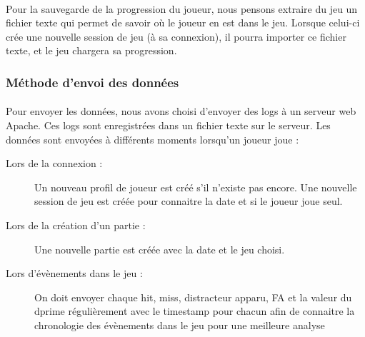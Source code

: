 \paragraph{}Pour la sauvegarde de la progression du joueur, nous pensons extraire du jeu un fichier texte qui permet de savoir où le joueur en est dans le jeu. Lorsque celui-ci crée une
nouvelle session de jeu (à sa connexion), il pourra importer ce fichier texte, et le jeu chargera sa progression.

\subsubsection{Méthode d'envoi des données}

\paragraph{}Pour envoyer les données, nous avons choisi d'envoyer des logs à un serveur web Apache. Ces logs sont enregistrées dans un fichier texte sur le serveur. Les données sont
envoyées à différents moments lorsqu'un joueur joue :
\begin{description}
\item[Lors de la connexion :] Un nouveau profil de joueur est créé s'il n'existe pas encore. Une nouvelle session de jeu est créée pour connaitre la date et si le joueur joue seul.
\item[Lors de la création d'un partie :] Une nouvelle partie est créée avec la date et le jeu choisi.
\item[Lors d'évènements dans le jeu :] On doit envoyer chaque hit, miss, distracteur apparu, FA et la valeur du dprime régulièrement avec le timestamp pour chacun afin de connaitre la
chronologie des évènements dans le jeu pour une meilleure analyse
\end{description}

